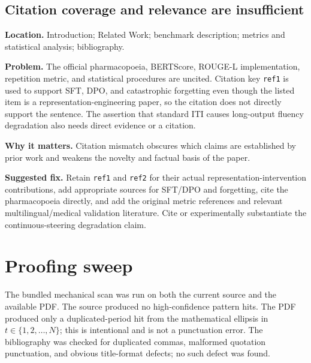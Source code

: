 \documentclass[11pt]{article}
\newcommand{\findinglabel}[1]{\textbf{#1}}
\begin{document}
\subsection*{Citation coverage and relevance are insufficient}

\findinglabel{Location.} Introduction; Related Work; benchmark description; metrics and statistical analysis; bibliography.

\findinglabel{Problem.} The official pharmacopoeia, BERTScore, ROUGE-L implementation, repetition metric, and statistical procedures are uncited.  Citation key \texttt{ref1} is used to support SFT, DPO, and catastrophic forgetting even though the listed item is a representation-engineering paper, so the citation does not directly support the sentence.  The assertion that standard ITI causes long-output fluency degradation also needs direct evidence or a citation.

\findinglabel{Why it matters.} Citation mismatch obscures which claims are established by prior work and weakens the novelty and factual basis of the paper.

\findinglabel{Suggested fix.} Retain \texttt{ref1} and \texttt{ref2} for their actual representation-intervention contributions, add appropriate sources for SFT/DPO and forgetting, cite the pharmacopoeia directly, and add the original metric references and relevant multilingual/medical validation literature.  Cite or experimentally substantiate the continuous-steering degradation claim.

\section*{Proofing sweep}

The bundled mechanical scan was run on both the current source and the available PDF.  The source produced no high-confidence pattern hits.  The PDF produced only a duplicated-period hit from the mathematical ellipsis in $t\in\{1,2,\ldots,N\}$; this is intentional and is not a punctuation error.  The bibliography was checked for duplicated commas, malformed quotation punctuation, and obvious title-format defects; no such defect was found.
\end{document}

